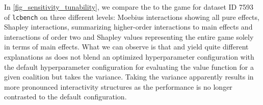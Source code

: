 \documentclass[letterpaper]{article} %
\begin{document}
In \cref{fig_sensitivity_tunability}, we compare the \sensitivity to the \dstunability game for dataset ID 7593 of \texttt{lcbench} on three different levels: Moebius interactions showing all pure effects, Shapley interactions, summarizing higher-order interactions to main effects and interactions of order two and Shapley values representing the entire game solely in terms of main effects. What we can observe is that \dstunability and \sensitivity yield quite different explanations as \sensitivity does not blend an optimized hyperparameter configuration with the default hyperparameter configuration for evaluating the value function for a given coalition but takes the variance. Taking the variance apparently results in more pronounced interactivity structures as the performance is no longer contrasted to the default configuration.
\end{document}
